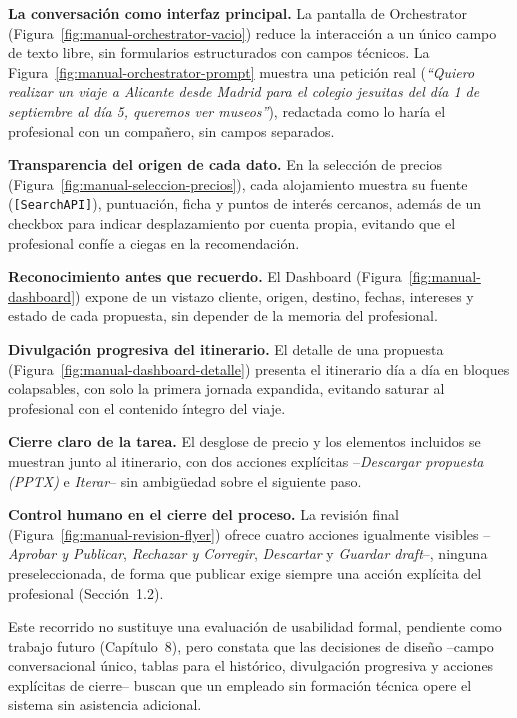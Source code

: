 \textbf{La conversación como interfaz principal.} La pantalla de Orchestrator (Figura~\ref{fig:manual-orchestrator-vacio}) reduce la interacción a un único campo de texto libre, sin formularios estructurados con campos técnicos. La Figura~\ref{fig:manual-orchestrator-prompt} muestra una petición real (\textit{``Quiero realizar un viaje a Alicante desde Madrid para el colegio jesuitas del día 1 de septiembre al día 5, queremos ver museos''}), redactada como lo haría el profesional con un compañero, sin campos separados.

\textbf{Transparencia del origen de cada dato.} En la selección de precios (Figura~\ref{fig:manual-seleccion-precios}), cada alojamiento muestra su fuente (\texttt{[SearchAPI]}), puntuación, ficha y puntos de interés cercanos, además de un checkbox para indicar desplazamiento por cuenta propia, evitando que el profesional confíe a ciegas en la recomendación.

\textbf{Reconocimiento antes que recuerdo.} El Dashboard (Figura~\ref{fig:manual-dashboard}) expone de un vistazo cliente, origen, destino, fechas, intereses y estado de cada propuesta, sin depender de la memoria del profesional.

\textbf{Divulgación progresiva del itinerario.} El detalle de una propuesta (Figura~\ref{fig:manual-dashboard-detalle}) presenta el itinerario día a día en bloques colapsables, con solo la primera jornada expandida, evitando saturar al profesional con el contenido íntegro del viaje.

\textbf{Cierre claro de la tarea.} El desglose de precio y los elementos incluidos se muestran junto al itinerario, con dos acciones explícitas --\textit{Descargar propuesta (PPTX)} e \textit{Iterar}-- sin ambigüedad sobre el siguiente paso.

\textbf{Control humano en el cierre del proceso.} La revisión final (Figura~\ref{fig:manual-revision-flyer}) ofrece cuatro acciones igualmente visibles --\textit{Aprobar y Publicar}, \textit{Rechazar y Corregir}, \textit{Descartar} y \textit{Guardar draft}--, ninguna preseleccionada, de forma que publicar exige siempre una acción explícita del profesional (Sección~1.2).

Este recorrido no sustituye una evaluación de usabilidad formal, pendiente como trabajo futuro (Capítulo~8), pero constata que las decisiones de diseño --campo conversacional único, tablas para el histórico, divulgación progresiva y acciones explícitas de cierre-- buscan que un empleado sin formación técnica opere el sistema sin asistencia adicional.

